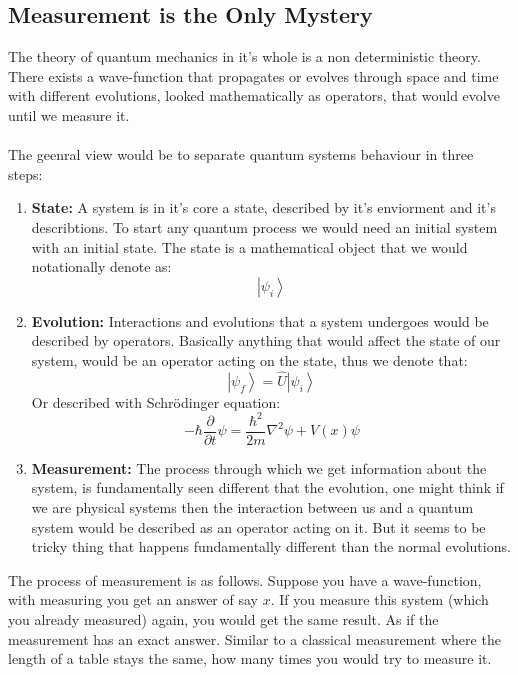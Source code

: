 \documentclass[10pt,a4paper]{article}
\newcounter{theo}
\begin{document}
        \subsection{Measurement is the Only Mystery}
            The theory of quantum mechanics in it's whole is a non deterministic theory. There exists a wave-function that propagates or evolves through space and time with different evolutions, looked mathematically as operators, that would evolve until we measure it.
            \\
            \\
            The geenral view would be to separate quantum systems behaviour in three steps:
            \begin{enumerate}
                \item \textbf{State:} A system is in it's core a state, described by it's enviorment and it's describtions. To start any quantum process we would need an initial system with an initial state. The state is a mathematical object that we would notationally denote as:
                \begin{equation}
                    \left| \psi_i \right> 
                \end{equation}
                \item \textbf{Evolution:} Interactions and evolutions that a system undergoes would be described by operators. Basically anything that would affect the state of our system, would be an operator acting on the state, thus we denote that:
                \begin{equation}
                    \left|\psi_f\right>  = \hat U \left|\psi_i\right>
                \end{equation}
                Or described with Schrödinger equation:
                \begin{equation}
                    -\hbar\frac{\partial}{\partial t} \psi = \frac{\hbar^2}{2m}\nabla^2 \psi + V(x)\psi 
                \end{equation}
                \item \textbf{Measurement:} The process through which we get information about the system, is fundamentally seen different that the evolution, one might think if we are physical systems then the interaction between us and a quantum system would be described as an operator acting on it. But it seems to be tricky thing that happens fundamentally different than the normal evolutions.
            \end{enumerate}
            The process of measurement is as follows. Suppose you have a wave-function, with measuring you get an answer of say $x$. If you measure this system (which you already measured) again, you would get the same result. As if the measurement has an exact answer. Similar to a classical measurement where the length of a table stays the same, how many times you would try to measure it.
\end{document}
